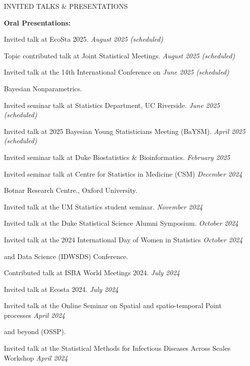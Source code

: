 \documentclass{resume} %
\newcommand{\thisYear}[1]{
	#1
}
\begin{document}
\begin{rSection}{INVITED TALKS \& PRESENTATIONS}
	
	\hspace{-.2in} {\textbf{Oral Presentations:}}
	
	Invited talk at EcoSta 2025. \hfill {\em August 2025 (scheduled)}
	
	Topic contributed talk at Joint Statistical Meetings. \hfill {\em August 2025 (scheduled)}
	
	Invited talk at the 14th International Conference on   \hfill {\em June 2025 (scheduled)}
	
	\vspace*{-0.1in}
	Bayesian Nonparametrics. 
	
	Invited seminar talk at Statistics Department, UC Riverside.  \hfill {\em June 2025 (scheduled)}
	
	Invited talk at 2025 Bayesian Young Statisticians Meeting (BaYSM). \hfill {\em April 2025 (scheduled)}
	

	Invited seminar talk at Duke Biostatistics \& Bioinformatics.  \hfill {\em February 2025}

	

	Invited seminar talk at Centre for Statistics in Medicine (CSM)  \hfill {\em December 2024}


	\vspace{-0.1in} 
	Botnar Research Centre., Oxford University. 


	Invited talk at the UM Statistics student seminar.  \hfill {\em November 2024} 

	
	\thisYear{
	Invited talk at the Duke Statistical Science Alumni Symposium.  \hfill {\em October 2024} 
}
	
	Invited talk at the 2024 International Day of Women  in Statistics 
	 \hfill {\em October 2024} 
	
	\vspace{-0.1in} 
	and Data Science (IDWSDS) Conference. 
	
	\thisYear{
	Contributed talk at ISBA World Meetings 2024.  \hfill {\em July 2024}
}
	
	\thisYear{
	Invited talk at Ecosta 2024.  \hfill {\em July 2024}
}
	
	Invited talk at the Online Seminar on Spatial and spatio-temporal Point processes   \hfill {\em April 2024}
	
	\vspace{-0.1in} 
	and beyond (OSSP).
	
	Invited talk at the Statistical Methods for Infectious Diseases Across Scales Workshop \hfill {\em April 2024}
	

\end{rSection}
\end{document}
